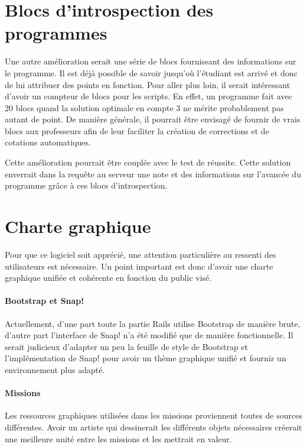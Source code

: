 \section{Blocs d'introspection des programmes}
Une autre amélioration serait une série de blocs fournissant des informations sur le programme. Il est déjà possible de savoir jusqu'où l'étudiant est arrivé et donc de lui attribuer des points en fonction.
Pour aller plus loin, il serait intéressant d'avoir un compteur de blocs pour les scripts. En effet, un programme fait avec 20 blocs quand la solution optimale en compte 3 ne mérite probablement pas autant de point.
De manière générale, il pourrait être envisagé de fournir de vrais blocs aux professeurs afin de leur faciliter la création de corrections et de cotations automatiques.

Cette amélioration pourrait être couplée avec le test de réussite. Cette solution enverrait dans la requête au serveur une note et des informations sur l'avancée du programme grâce à ces blocs d'introspection.

\section{Charte graphique}
Pour que ce logiciel soit apprécié, une attention particulière au ressenti des utilisateurs est nécessaire. Un point important est donc d'avoir une charte graphique unifiée et cohérente en fonction du public visé.

\paragraph{Bootstrap et Snap!}
Actuellement, d'une part toute la partie Rails utilise Bootstrap de manière brute, d'autre part l'interface de Snap! n'a été modifié que de manière fonctionnelle. Il serait judicieux d'adapter un peu la feuille de style de Bootstrap et l'implémentation de Snap! pour avoir un thème graphique unifié et fournir un environnement plus adapté.

\paragraph{Missions}
Les ressources graphiques utilisées dans les missions proviennent toutes de sources différentes. Avoir un artiste qui dessinerait les différents objets nécessaires créerait une meilleure unité entre les missions et les mettrait en valeur.


%
%
%
%
%
%

